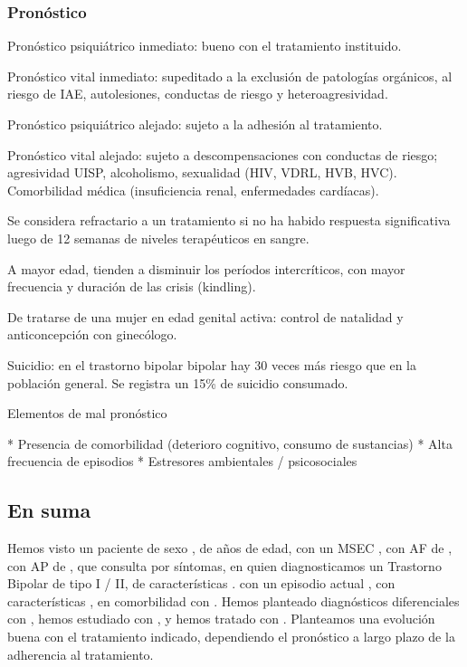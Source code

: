 \subsubsection*{Pronóstico}
Pronóstico psiquiátrico inmediato: bueno con el tratamiento instituido.

Pronóstico vital inmediato: supeditado a la exclusión de patologías orgánicos, al riesgo de IAE, autolesiones, conductas de riesgo y heteroagresividad.

Pronóstico psiquiátrico alejado: sujeto a la adhesión al tratamiento.

Pronóstico vital alejado: sujeto a descompensaciones con conductas de riesgo; agresividad UISP, alcoholismo, sexualidad (HIV, VDRL, HVB, HVC). Comorbilidad médica (insuficiencia renal, enfermedades cardíacas).

Se considera refractario a un tratamiento si no ha habido respuesta significativa luego de 12 semanas de niveles terapéuticos en sangre.

A mayor edad, tienden a disminuir los períodos intercríticos, con mayor frecuencia y duración de las crisis (kindling).

De tratarse de una mujer en edad genital activa: control de natalidad y anticoncepción con ginecólogo.

Suicidio: en el trastorno bipolar bipolar hay 30 veces más riesgo que en la población general. Se registra un 15\% de suicidio consumado.

Elementos de mal pronóstico

* Presencia de comorbilidad (deterioro cognitivo, consumo de sustancias)
* Alta frecuencia de episodios
* Estresores ambientales / psicosociales

\subsection*{En suma}
Hemos visto un paciente de sexo \faQuestionCircle, de \faQuestionCircle años de edad, con un MSEC \faQuestionCircle, con AF de \faQuestionCircle, con AP de \faQuestionCircle, que consulta por \faQuestionCircle síntomas, en quien diagnosticamos un Trastorno Bipolar de tipo I / II, de características \faQuestionCircle. con un episodio actual \faQuestionCircle, con características \faQuestionCircle, en comorbilidad con \faQuestionCircle. Hemos planteado diagnósticos diferenciales con \faQuestionCircle, hemos estudiado con \faQuestionCircle, y hemos tratado con \faQuestionCircle. Planteamos una evolución buena con el tratamiento indicado, dependiendo el pronóstico a largo plazo de la adherencia al tratamiento.
